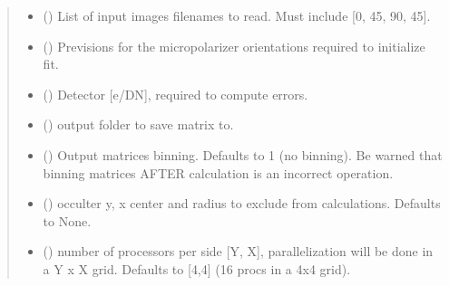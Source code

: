 \documentclass[letterpaper,10pt,english]{sphinxmanual}
\begin{document}
\begin{fulllineitems}
\begin{quote}
\begin{description}
\begin{itemize}
\item {} 
\sphinxAtStartPar
{} (\sphinxstyleliteralemphasis{\sphinxupquote{{[}}}\sphinxstyleliteralemphasis{\sphinxupquote{{]}}}) \textendash{} List of input images filenames to read. Must include {[}0, 45, 90, \sphinxhyphen{}45{]}.

\item {} 
\sphinxAtStartPar
{} (\sphinxstyleliteralemphasis{\sphinxupquote{{[}}}\sphinxstyleliteralemphasis{\sphinxupquote{{]}}}) \textendash{} Previsions for the micropolarizer orientations required to initialize fit.

\item {} 
\sphinxAtStartPar
{} () \textendash{} Detector {[}e\sphinxhyphen{}/DN{]}, required to compute errors.

\item {} 
\sphinxAtStartPar
{} () \textendash{} output folder to save matrix to.

\item {} 
\sphinxAtStartPar
{} (\sphinxstyleliteralemphasis{\sphinxupquote{, }}) \textendash{} Output matrices binning. Defaults to 1 (no binning). Be warned that binning matrices AFTER calculation is an incorrect operation.

\item {} 
\sphinxAtStartPar
{} (\sphinxstyleliteralemphasis{\sphinxupquote{, }}) \textendash{} occulter y, x center and radius to exclude from calculations. Defaults to None.

\item {} 
\sphinxAtStartPar
{} (\sphinxstyleliteralemphasis{\sphinxupquote{{[}}}\sphinxstyleliteralemphasis{\sphinxupquote{, }}\sphinxstyleliteralemphasis{\sphinxupquote{{]}}}\sphinxstyleliteralemphasis{\sphinxupquote{, }}) \textendash{} number of processors per side {[}Y, X{]}, parallelization will be done in a Y x X grid. Defaults to {[}4,4{]} (16 procs in a 4x4 grid).


\end{itemize}
\end{description}
\end{quote}
\end{fulllineitems}
\end{document}
